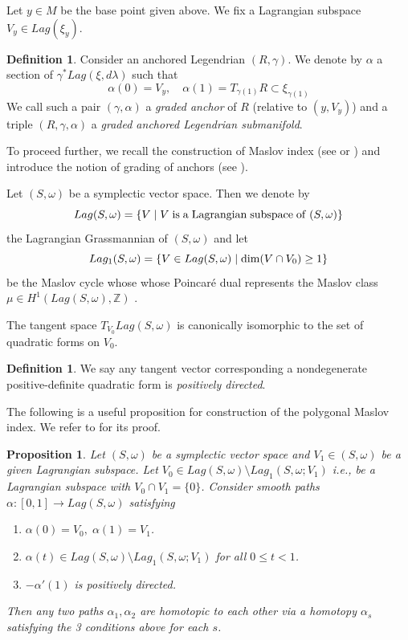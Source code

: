 \documentclass[reqno]{amsart}
\def\Z{\ifmmode{\mathbb Z}\else{$\mathbb Z$}\fi} %
\theoremstyle{theorem}
\newtheorem{prop}[thm]{Proposition}
\theoremstyle{definition}
\newtheorem{defn}[thm]{Definition}
\numberwithin{equation}{section}
\def\Z{{\mathbb Z}}
\def\Z{\mathbb{Z}}
\def\Z{\ifmmode{\mathbb Z}\else{$\mathbb Z$}\fi} %
\def\Z{{\mathbb Z}}
\def\opname#1{\mathop{\kern0pt{\rm #1}}\nolimits}
\def\dim{\opname{dim}}
\begin{document}
Let $y\in M$ be the base point given above.  We fix a Lagrangian subspace $V_y\in Lag(\xi_y)$.

\begin{defn}
Consider an anchored Legendrian $(R,\gamma)$. We denote by $\alpha$ a section of
$\gamma^*Lag(\xi,d\lambda)$ such that
$$
 \alpha(0)=V_y, \quad \alpha(1)=T_{\gamma(1)}R \subset \xi_{\gamma(1)}
 $$
We call such a pair $(\gamma,\alpha)$ a \emph{graded anchor} of $R$ (relative to $(y,V_y)$) and a triple $(R,\gamma,\alpha)$ a \emph{graded anchored Legendrian submanifold}.
\end{defn}

To proceed further, we recall the construction of Maslov index (see \cite{arnold:index} or \cite{fooo:anchored})
and introduce the notion of grading of anchors (see \cite{fooo:anchored}).

Let $(S,\omega)$ be a symplectic vector space. Then we denote by
$$Lag(S,\omega) = \{V \mid V \; {\rm is} \; {\rm a} \; {\rm Lagrangian} \; {\rm subspace} \; {\rm of} \; (S,\omega)\}$$
the Lagrangian Grassmannian of $(S,\omega)$ and let
$$
Lag_1(S,\omega) = \{V\in Lag(S,\omega) \mid \dim(V\cap V_0)\geq 1\}
$$
be the Maslov cycle whose
 whose Poincar\'e dual represents the Maslov class $\mu\in H^1(Lag(S,\omega),\Z)$ \cite{arnold:index}.

The tangent space $T_{V_0}Lag(S,\omega)$ is canonically isomorphic to the set of quadratic forms on $V_0$.

\begin{defn}\label{defn:positively-directed}
We say any tangent vector corresponding a nondegenerate positive-definite quadratic form is \emph{positively directed}.
\end{defn}

The following is a useful proposition for construction of the polygonal Maslov index. We refer to \cite{arnold:index} for its proof.

\begin{prop}\label{prop:directed-lag-path}
Let $(S,\omega)$ be a symplectic vector space and $V_1 \in (S,\omega)$ be a given Lagrangian subspace. Let $V_0 \in Lag(S,\omega)\setminus Lag_1(S,\omega;V_1)$ i.e., be a Lagrangian subspace with $V_0\cap V_1=\{0\}$. Consider smooth paths $\alpha:[0,1] \rightarrow Lag(S,\omega)$ satisfying
\begin{enumerate}
\item $\alpha(0)=V_0,\; \alpha(1)=V_1$.
\item $\alpha(t)\in Lag(S,\omega)\setminus Lag_1(S,\omega;V_1)$ for all $0\leq t<1$.
\item $-\alpha'(1)$ is positively directed.
\end{enumerate}
Then any two paths $\alpha_1,\alpha_2$ are homotopic to each other via a homotopy $\alpha_s$ satisfying the 3 conditions above for each $s$.
\end{prop}
\end{document}
